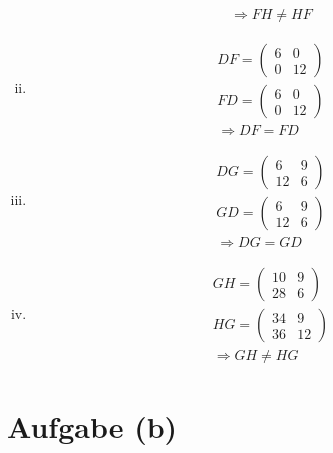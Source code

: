 \documentclass{article}
\begin{document}
\begin{enumerate}[(i)]
\begin{align*}
            \Rightarrow FH\neq HF
        \end{align*}
        \item 
        \begin{align*}
            DF = \begin{pmatrix}
                6 & 0\\
                0 & 12
            \end{pmatrix} \\
            FD = \begin{pmatrix}
                6 & 0\\
                0 & 12
            \end{pmatrix}\\
            \Rightarrow DF=FD
        \end{align*}
        \item 
        \begin{align*}
            DG = \begin{pmatrix}
                6 & 9\\
                12 & 6
            \end{pmatrix} \\
            GD = \begin{pmatrix}
                6 & 9\\
                12 & 6
            \end{pmatrix}\\
            \Rightarrow DG=GD
        \end{align*}
        \item 
        \begin{align*}
            GH = \begin{pmatrix}
                10 & 9\\
                28 & 6
            \end{pmatrix} \\
            HG = \begin{pmatrix}
                34 & 9\\
                36 & 12
            \end{pmatrix}\\
            \Rightarrow GH\neq HG
        \end{align*}
    \end{enumerate}

    \section{Aufgabe (b)}
    
\end{document}
